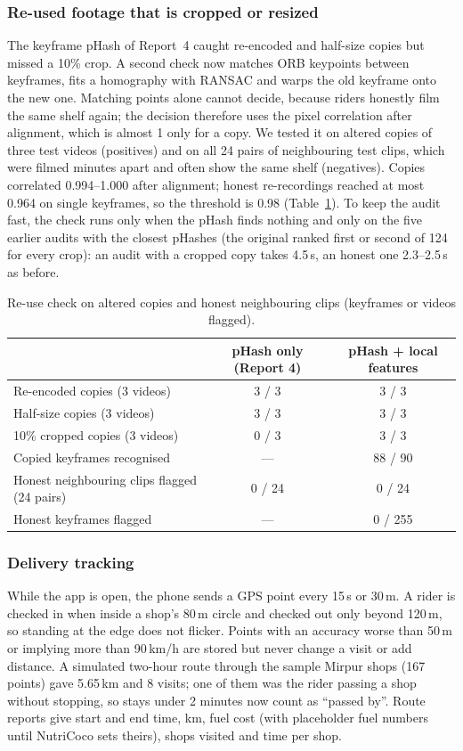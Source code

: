 \subsubsection{Re-used footage that is cropped or resized}\label{sec:r5-reuse}
The keyframe pHash of Report~4 caught re-encoded and half-size copies but missed a 10\% crop. A second
check now matches ORB keypoints between keyframes, fits a homography with RANSAC and warps the old
keyframe onto the new one. Matching points alone cannot decide, because riders honestly film the same
shelf again; the decision therefore uses the pixel correlation after alignment, which is almost 1 only
for a copy. We tested it on altered copies of three test videos (positives) and on all 24 pairs of
neighbouring test clips, which were filmed minutes apart and often show the same shelf (negatives).
Copies correlated 0.994--1.000 after alignment; honest re-recordings reached at most 0.964 on single
keyframes, so the threshold is 0.98 (Table~\ref{tab:r5-reuse}). To keep the audit fast, the check runs
only when the pHash finds nothing and only on the five earlier audits with the closest pHashes (the
original ranked first or second of 124 for every crop): an audit with a cropped copy takes 4.5\,s, an
honest one 2.3--2.5\,s as before.

\begin{table}[!t]
\centering
\caption{Re-use check on altered copies and honest neighbouring clips (keyframes or videos flagged).}
\label{tab:r5-reuse}
\begin{tabular}{lcc}
\hline
 & pHash only (Report 4) & pHash + local features \\
\hline
Re-encoded copies (3 videos) & 3 / 3 & 3 / 3 \\
Half-size copies (3 videos) & 3 / 3 & 3 / 3 \\
10\% cropped copies (3 videos) & 0 / 3 & 3 / 3 \\
Copied keyframes recognised & --- & 88 / 90 \\
Honest neighbouring clips flagged (24 pairs) & 0 / 24 & 0 / 24 \\
Honest keyframes flagged & --- & 0 / 255 \\
\hline
\end{tabular}
\end{table}

\subsubsection{Delivery tracking}
While the app is open, the phone sends a GPS point every 15\,s or 30\,m. A rider is checked in when
inside a shop's 80\,m circle and checked out only beyond 120\,m, so standing at the edge does not
flicker. Points with an accuracy worse than 50\,m or implying more than 90\,km/h are stored but never
change a visit or add distance. A simulated two-hour route through the sample Mirpur shops (167 points)
gave 5.65\,km and 8 visits; one of them was the rider passing a shop without stopping, so stays under
2 minutes now count as ``passed by''. Route reports give start and end time, km, fuel cost (with
placeholder fuel numbers until NutriCoco sets theirs), shops visited and time per shop.


